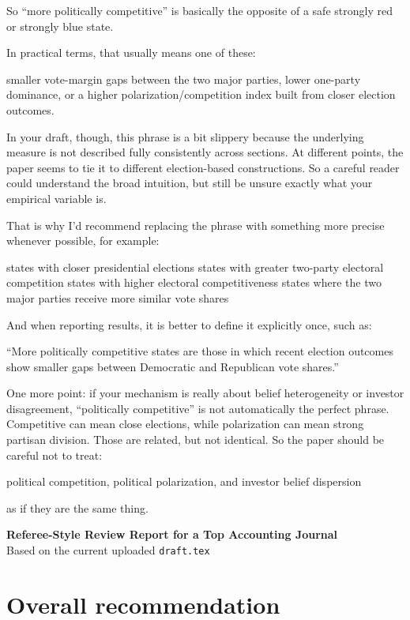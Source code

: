 

So “more politically competitive” is basically the opposite of a safe strongly red or strongly blue state.

In practical terms, that usually means one of these:

smaller vote-margin gaps between the two major parties,
lower one-party dominance,
or a higher polarization/competition index built from closer election outcomes.

In your draft, though, this phrase is a bit slippery because the underlying measure is not described fully consistently across sections. At different points, the paper seems to tie it to different election-based constructions. So a careful reader could understand the broad intuition, but still be unsure exactly what your empirical variable is.

That is why I’d recommend replacing the phrase with something more precise whenever possible, for example:

states with closer presidential elections
states with greater two-party electoral competition
states with higher electoral competitiveness
states where the two major parties receive more similar vote shares

And when reporting results, it is better to define it explicitly once, such as:

“More politically competitive states are those in which recent election outcomes show smaller gaps between Democratic and Republican vote shares.”

One more point: if your mechanism is really about belief heterogeneity or investor disagreement, “politically competitive” is not automatically the perfect phrase. Competitive can mean close elections, while polarization can mean strong partisan division. Those are related, but not identical. So the paper should be careful not to treat:

political competition,
political polarization, and
investor belief dispersion

as if they are the same thing.


\begin{center}
{\Large \textbf{Referee-Style Review Report for a Top Accounting Journal}}\\[0.4em]
{\normalsize Based on the current uploaded \texttt{draft.tex}}
\end{center}

\section*{Overall recommendation}

